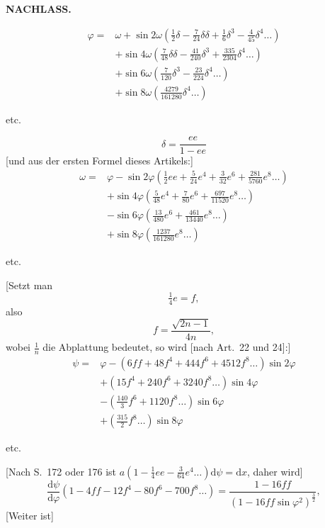 \par\clearpage
{}\hfill{\small\textbf{NACHLASS.}}\hfill\null\par\medskip
\[
\begin{aligned}
\varphi={}&\omega+\sin2\omega(\tfrac12\delta-\tfrac7{24}\delta\delta+\tfrac16\delta^3-\tfrac4{45}\delta^4\ldots)\\
&+\sin4\omega(\tfrac7{48}\delta\delta-\tfrac{41}{240}\delta^3+\tfrac{335}{2304}\delta^4\ldots)\\
&+\sin6\omega(\tfrac7{120}\delta^3-\tfrac{23}{224}\delta^4\ldots)\\
&+\sin8\omega(\tfrac{4279}{161280}\delta^4\ldots)
\end{aligned}
\]
{\centering etc.\par}
\[\delta=\frac{ee}{1-ee}\]
[und aus der ersten Formel dieses Artikels:]
\[
\begin{aligned}
\omega={}&\varphi-\sin2\varphi(\tfrac12ee+\tfrac5{24}e^4+\tfrac3{32}e^6+\tfrac{281}{5760}e^8\ldots)\\
&+\sin4\varphi(\tfrac5{48}e^4+\tfrac7{80}e^6+\tfrac{697}{11520}e^8\ldots)\\
&-\sin6\varphi(\tfrac{13}{480}e^6+\tfrac{461}{13440}e^8\ldots)\\
&+\sin8\varphi(\tfrac{1237}{161280}e^8\ldots)
\end{aligned}
\]
{\centering etc.\par}
\bigskip
{\centering [25.]\par}
[Setzt man
\[\tfrac14e=f,\]
\noindent also
\[f=\frac{\sqrt{2n-1}}{4n},\]
\noindent wobei \(\frac1n\) die Abplattung bedeutet, so wird [nach Art.~22 und 24]:]
\[
\begin{aligned}
\psi={}&\varphi-(6ff+48f^4+444f^6+4512f^8\ldots)\sin2\varphi\\
&+(15f^4+240f^6+3240f^8\ldots)\sin4\varphi\\
&-(\tfrac{140}{3}f^6+1120f^8\ldots)\sin6\varphi\\
&+(\tfrac{315}{2}f^8\ldots)\sin8\varphi
\end{aligned}
\]
{\centering etc.\par}
[Nach S.~172 oder 176 ist \(a(1-\tfrac14ee-\tfrac3{64}e^4\ldots)\mathrm d\psi=\mathrm dx\), daher wird]
\[
\frac{\mathrm d\psi}{\mathrm d\varphi}(1-4ff-12f^4-80f^6-700f^8\ldots)=\frac{1-16ff}{(1-16ff\sin\varphi^2)^{\frac32}},
\]
[Weiter ist]

